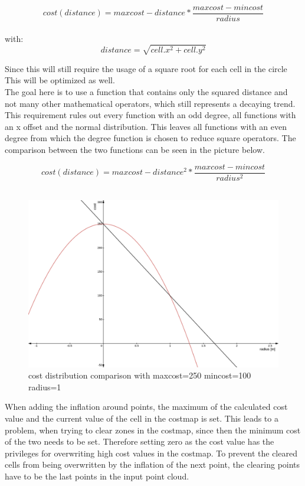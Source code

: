 \[cost(distance)=maxcost-distance*\frac{maxcost-mincost}{radius}\]\\
with: \[distance=\sqrt{cell.x^2+cell.y^2}\]

 Since this will still require the usage of a square root for each cell in the circle This will be optimized as well.\\

The goal here is to use a function that contains only the squared distance and not many other mathematical operators, which still represents a decaying trend. This requirement rules out every function with an odd degree, all functions with an x offset and the normal distribution. This leaves all functions with an even degree from which the  degree function is chosen to reduce square operators. The comparison between the two functions can be seen in the picture below.

\[cost(distance)=maxcost-distance^2*\frac{maxcost-mincost}{radius^2}\]\\

\begin{figure}[H]
	\begin{center}
	\includegraphics[width=140mm]{Pictures/linear cost comparison}
	\caption{cost distribution comparison with maxcost=250 mincost=100 radius=1}
	\end{center}
\end{figure}

When adding the inflation around points, the maximum of the calculated cost value and the current value of the cell in the costmap is set.
This leads to a problem, when trying to clear zones in the costmap, since then the minimum cost of the two needs to be set. Therefore setting zero as the cost value has the privileges for overwriting high cost values in the costmap.
 To prevent the cleared cells from being overwritten by the inflation of the next point, the clearing points have to be the last points in the input point cloud.\\

